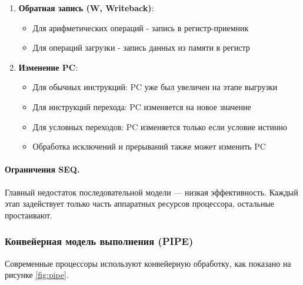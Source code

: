 \documentclass[12pt,a4paper]{article}
\begin{document}
\begin{enumerate}
    \item  \textbf{Обратная запись (W, Writeback)}:
    \begin{itemize}
        \item Для арифметических операций - запись в регистр-приемник
        \item Для операций загрузки - запись данных из памяти в регистр
    \end{itemize}

    \item \textbf{Изменение PC}:
    \begin{itemize}
        \item Для обычных инструкций: PC уже был увеличен на этапе выгрузки
        \item Для инструкций перехода: PC изменяется на новое значение
        \item Для условных переходов: PC изменяется только если условие истинно
        \item Обработка исключений и прерываний также может изменить PC
    \end{itemize}
\end{enumerate}

\paragraph{Ограничения SEQ.}
Главный недостаток последовательной модели — низкая эффективность. Каждый этап задействует только часть аппаратных ресурсов процессора, остальные простаивают.

\subsubsection{Конвейерная модель выполнения (PIPE)}
Современные процессоры используют конвейерную обработку, как показано на рисунке \ref{fig:pipe}.
\end{document}

